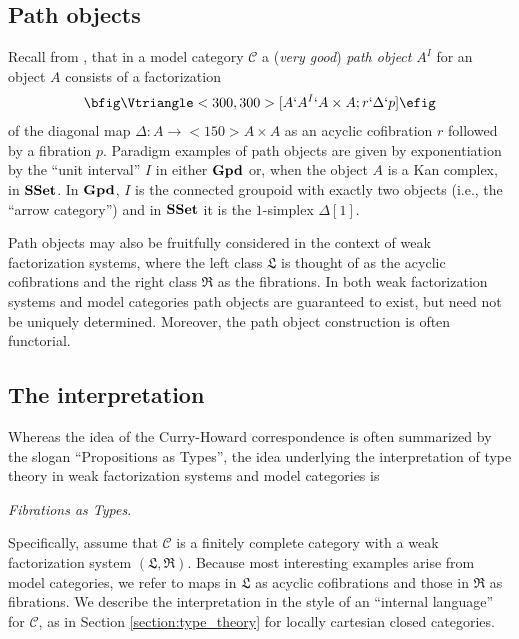 \documentclass{amsart}
\newcommand{\groupoids}{\textnormal{\textbf{Gpd}}}
\newcommand{\ssets}{\textnormal{\textbf{SSet}}}
\theoremstyle{definition}
\theoremstyle{remark}
\begin{document}
\subsection{Path objects}

Recall from \cite{Hovey:MC}, that in a model category $\mathcal{C}$ a (\emph{very good}) \emph{path
  object} $A^{I}$ for an object $A$ consists of a factorization 
\begin{align*}
  \bfig
  \Vtriangle<300,300>[A`A^{I}`A\times A;r`\Delta`p]
  \efig
\end{align*}
of the diagonal map $\Delta:A\to<150>A\times A$ as an acyclic
cofibration $r$ followed by a fibration $p$.  Paradigm examples of
path objects are given by exponentiation by the
``unit interval'' $I$ in either $\groupoids$ or, when the object $A$
is a Kan complex, in $\ssets$.  In
$\groupoids$, $I$ is the connected groupoid with
exactly two objects (i.e., the ``arrow category'') and in $\ssets$ it
is the $1$-simplex $\Delta[1]$.

Path objects may also be fruitfully considered in the context of weak
factorization systems, where the left class $\mathfrak{L}$ is
thought of as the acyclic cofibrations and the right class
$\mathfrak{R}$ as the fibrations.  In both weak factorization systems
and model categories path objects are guaranteed to exist, but need
not be uniquely determined.  Moreover,
the path object construction is often functorial.

\subsection{The interpretation}

Whereas the idea of the Curry-Howard correspondence is often
summarized by the slogan ``Propositions as Types'', the idea
underlying the interpretation of type theory in weak factorization
systems and model categories is 
\begin{center}
  \emph{Fibrations as Types}.
\end{center}
Specifically, assume that $\mathcal{C}$ is a finitely complete
category with a weak factorization system
$(\mathfrak{L},\mathfrak{R})$.  Because most interesting examples
arise from model categories, we refer to maps in $\mathfrak{L}$ as
acyclic cofibrations and those in $\mathfrak{R}$
as fibrations.  We describe the interpretation in the style of an
``internal language'' for $\mathcal{C}$, as in Section
\ref{section:type_theory} for locally cartesian closed categories.
\end{document}

